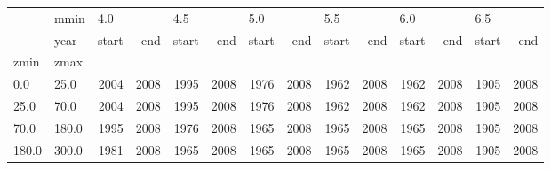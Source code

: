 \begin{tabular}{llrrrrrrrrrrrr}
\toprule
      & mmin & \multicolumn{2}{l}{4.0} & \multicolumn{2}{l}{4.5} & \multicolumn{2}{l}{5.0} & \multicolumn{2}{l}{5.5} & \multicolumn{2}{l}{6.0} & \multicolumn{2}{l}{6.5} \\
      & year & start &   end & start &   end & start &   end & start &   end & start &   end & start &   end \\
zmin & zmax &       &       &       &       &       &       &       &       &       &       &       &       \\
\midrule
0.0   & 25.0  &  2004 &  2008 &  1995 &  2008 &  1976 &  2008 &  1962 &  2008 &  1962 &  2008 &  1905 &  2008 \\
25.0  & 70.0  &  2004 &  2008 &  1995 &  2008 &  1976 &  2008 &  1962 &  2008 &  1962 &  2008 &  1905 &  2008 \\
70.0  & 180.0 &  1995 &  2008 &  1976 &  2008 &  1965 &  2008 &  1965 &  2008 &  1965 &  2008 &  1905 &  2008 \\
180.0 & 300.0 &  1981 &  2008 &  1965 &  2008 &  1965 &  2008 &  1965 &  2008 &  1965 &  2008 &  1905 &  2008 \\
\bottomrule
\end{tabular}
